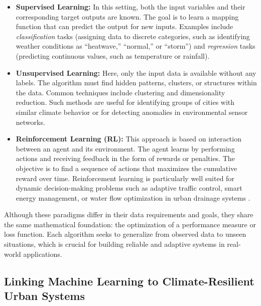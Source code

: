 \documentclass[12pt]{article}
\begin{document}
\begin{itemize}
    \item \textbf{Supervised Learning:}  
    In this setting, both the input variables and their corresponding target outputs are known.  
    The goal is to learn a mapping function that can predict the output for new inputs.  
    Examples include \textit{classification} tasks (assigning data to discrete categories, such as identifying weather conditions as ``heatwave,'' ``normal,'' or ``storm'') and \textit{regression} tasks (predicting continuous values, such as temperature or rainfall).

    \item \textbf{Unsupervised Learning:}  
    Here, only the input data is available without any labels.  
    The algorithm must find hidden patterns, clusters, or structures within the data.  
    Common techniques include clustering and dimensionality reduction.  
    Such methods are useful for identifying groups of cities with similar climate behavior or for detecting anomalies in environmental sensor networks.

    \item \textbf{Reinforcement Learning (RL):}  
    This approach is based on interaction between an agent and its environment.  
    The agent learns by performing actions and receiving feedback in the form of rewards or penalties.  
    The objective is to find a sequence of actions that maximizes the cumulative reward over time.  
    Reinforcement learning is particularly well suited for dynamic decision-making problems such as adaptive traffic control, smart energy management, or water flow optimization in urban drainage systems \cite{sutton1998reinforcement}.
\end{itemize}

Although these paradigms differ in their data requirements and goals, they share the same mathematical foundation: the optimization of a performance measure or loss function. 
Each algorithm seeks to generalize from observed data to unseen situations, which is crucial for building reliable and adaptive systems in real-world applications.



\subsection{Linking Machine Learning to Climate-Resilient Urban Systems}
\end{document}
